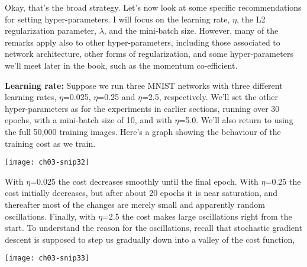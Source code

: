 Okay, that's the broad strategy. Let's now look at some specific recommendations for setting hyper-parameters. I will focus on the learning rate, $\eta$, the L2 regularization parameter, $\lambda$, and the mini-batch size. However, many of the remarks apply also to other hyper-parameters, including those associated to network architecture, other forms of regularization, and some hyper-parameters we'll meet later in the book, such as the momentum co-efficient.

\textbf{Learning rate:} Suppose we run three MNIST networks with three different learning rates, $\eta$=0.025, $\eta$=0.25 and $\eta$=2.5, respectively. We'll set the other hyper-parameters as for the experiments in earlier sections, running over 30 epochs, with a mini-batch size of 10, and with $\eta$=5.0. We'll also return to using the full 50,000 training images. Here's a graph showing the behaviour of the training cost as we train.

\begin{marginfigure}
    \texttt{[image: ch03-snip32]}
    \end{marginfigure}

With $\eta$=0.025 the cost decreases smoothly until the final epoch. With $\eta$=0.25 the cost initially decreases, but after about 20 epochs it is near saturation, and thereafter most of the changes are merely small and apparently random oscillations. Finally, with $\eta$=2.5 the cost makes large oscillations right from the start. To understand the reason for the oscillations, recall that stochastic gradient descent is supposed to step us gradually down into a valley of the cost function,

\begin{marginfigure}
    \texttt{[image: ch03-snip33]}
    \end{marginfigure}

